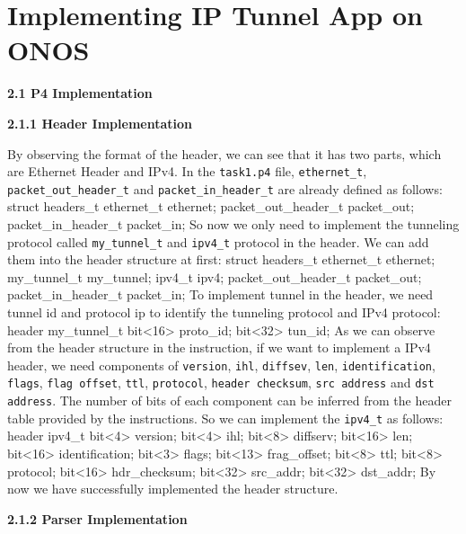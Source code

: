 \documentclass{article}%
\newenvironment{code}%
   {\snugshade\verbatim}%
   {\endverbatim\endsnugshade}
\begin{document}
\section{Implementing IP Tunnel App on ONOS}
\begin{flushleft}
\begin{LARGE}
\textbf{2.1 P4 Implementation}
\end{LARGE}
\end{flushleft}
\begin{Large}
\begin{flushleft}
\textbf{2.1.1 Header Implementation}
\end{flushleft}
By observing the format of the header, we can see that it has two parts, which are Ethernet Header and IPv4. In the \texttt{task1.p4} file, \texttt{ethernet\_t}, \texttt{packet\_out\_header\_t} and \texttt{packet\_in\_header\_t} are already defined as follows:
\begin{code}
    struct headers_t{
        ethernet_t ethernet;
        packet_out_header_t packet_out;
        packet_in_header_t packet_in;
    }
\end{code}
So now we only need to implement the tunneling protocol called \texttt{my\_tunnel\_t} and \texttt{ipv4\_t} protocol in the header. We can add them into the header structure at first:
\begin{code}
    struct headers_t {
        ethernet_t ethernet;
        my_tunnel_t my_tunnel;
        ipv4_t ipv4;
        packet_out_header_t packet_out;
        packet_in_header_t packet_in;
    }
\end{code}
To implement tunnel in the header, we need tunnel id and protocol ip to identify the tunneling protocol and IPv4 protocol:
\begin{code}
    header my_tunnel_t {
        bit<16> proto_id;
        bit<32> tun_id;
    }
\end{code}
\newpage
As we can observe from the header structure in the instruction, if we want to implement a IPv4 header, we need components of \texttt{version}, \texttt{ihl}, \texttt{diffsev}, \texttt{len}, \texttt{identification}, \texttt{flags}, \texttt{flag offset}, \texttt{ttl}, \texttt{protocol}, \texttt{header checksum}, \texttt{src address} and \texttt{dst address}. The number of bits of each component can be inferred from the header table provided by the instructions. So we can implement the \texttt{ipv4\_t} as follows:
\begin{code}
    header ipv4_t {
        bit<4>  version;
        bit<4>  ihl;
        bit<8>  diffserv;
        bit<16> len;
        bit<16> identification;
        bit<3>  flags;
        bit<13> frag_offset;
        bit<8>  ttl;
        bit<8>  protocol;
        bit<16> hdr_checksum;
        bit<32> src_addr;
        bit<32> dst_addr;
    }
\end{code}
By now we have successfully implemented the header structure.
\begin{flushleft}
\textbf{2.1.2 Parser Implementation}
\end{flushleft}


\end{Large}
\end{document}
